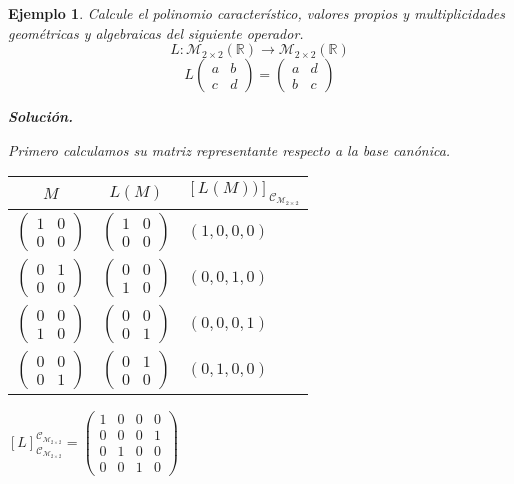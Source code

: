 \documentclass[12pt]{book}
\newtheorem{ejem}{Ejemplo}
\def\R{\mathbb{R}}
\def\M{\mathcal{M}}
\def\Ccal{\mathcal{C}}
\begin{document}
\begin{ejem}
Calcule el polinomio característico, valores propios y multiplicidades geométricas y algebraicas del siguiente operador.
$$ L:\M_{2\times 2}(\R)\rightarrow\M_{2\times 2}(\R)$$
$$L\left(\begin{array}{cc} a&b\\c&d\end{array}\right)=\left(\begin{array}{cc} a&d\\b&c\end{array}\right)$$

{\bf Solución.} {\em
Primero calculamos su matriz representante respecto a la base canónica.

\begin{tabular}{c|c|l}
$M$&$L(M)$&$[L(M))]_{\Ccal_{\M_{2\times 2}}}$\\\hline
$\left(\begin{array}{cc} 1&0\\0&0\end{array}\right)$& $\left(\begin{array}{cc} 1&0\\0&0\end{array}\right)$& $(1,0,0,0)$\\
$\left(\begin{array}{cc} 0&1\\0&0\end{array}\right)$& $\left(\begin{array}{cc} 0&0\\1&0\end{array}\right)$& $(0,0,1,0)$\\
$\left(\begin{array}{cc} 0&0\\1&0\end{array}\right)$& $\left(\begin{array}{cc} 0&0\\0&1\end{array}\right)$& $(0,0,0,1)$\\
$\left(\begin{array}{cc} 0&0\\0&1\end{array}\right)$& $\left(\begin{array}{cc} 0&1\\0&0\end{array}\right)$& $(0,1,0,0)$
\end{tabular}
\quad
$[L]_{\Ccal_{\M_{2\times 2}}}^{\Ccal_{\M_{2\times 2}}}=\left(\begin{array}{cccc} 1&0&0&0\\0&0&0&1\\0&1&0&0\\0&0&1&0\end{array}\right)$

}
\end{ejem}
\end{document}
